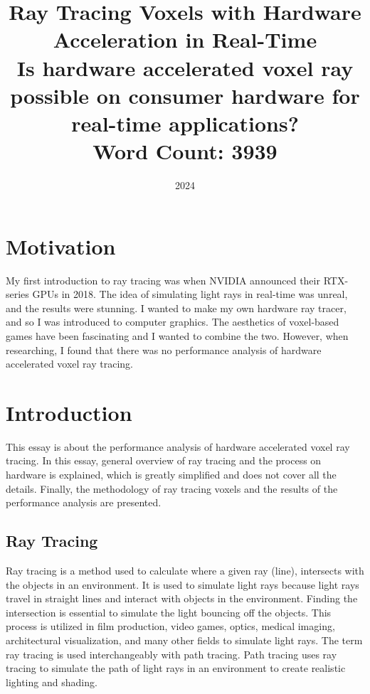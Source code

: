 \documentclass[12pt]{article}
\title{Ray Tracing Voxels with Hardware Acceleration in Real-Time \\
    \vspace{1cm}
    \large Is hardware accelerated voxel ray possible on consumer hardware for real-time applications? \\
    \vspace{1cm}
    \large Word Count: 3939
    }
\author{}
\date{2024}
\begin{document}
\maketitle
\clearpage

\tableofcontents
\clearpage


\clearpage

\section{Motivation}

My first introduction to ray tracing was when NVIDIA announced their RTX-series GPUs in 2018.
The idea of simulating light rays in real-time was unreal, and the results were stunning.
I wanted to make my own hardware ray tracer, and so I was introduced to computer graphics.
The aesthetics of voxel-based games have been fascinating and I wanted to combine the two.
However, when researching, I found that there was no performance analysis of hardware accelerated voxel ray tracing.

\section{Introduction}

This essay is about the performance analysis of hardware accelerated voxel ray tracing.
In this essay, general overview of ray tracing and the process on hardware is explained,
which is greatly simplified and does not cover all the details. Finally, the methodology of
ray tracing voxels and the results of the performance analysis are presented.

\subsection{Ray Tracing}

Ray tracing is a method used to calculate where a given ray (line), intersects
with the objects in an environment. It is used to simulate light rays because light rays
travel in straight lines and interact with objects in the environment.
Finding the intersection is essential to simulate the light bouncing off the objects.
This process is utilized in film production, video games, optics, medical imaging,
architectural visualization, and many other fields to simulate light rays.
The term ray tracing is used interchangeably with path tracing. Path tracing uses ray tracing to simulate
the path of light rays in an environment to create realistic lighting and shading.
\end{document}
